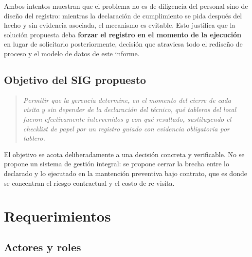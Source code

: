 \documentclass[10pt,letterpaper]{article}
\begin{document}
Ambos intentos muestran que el problema no es de diligencia del personal sino de
diseño del registro: mientras la declaración de cumplimiento se pida después del
hecho y sin evidencia asociada, el mecanismo es evitable. Esto justifica que la
solución propuesta deba \textbf{forzar el registro en el momento de la ejecución} en
lugar de solicitarlo posteriormente, decisión que atraviesa todo el rediseño de
proceso y el modelo de datos de este informe.

\subsection{Objetivo del SIG propuesto}

\begin{quote}
\itshape
Permitir que la gerencia determine, en el momento del cierre de cada visita y sin
depender de la declaración del técnico, qué tableros del local fueron efectivamente
intervenidos y con qué resultado, sustituyendo el checklist de papel por un registro
guiado con evidencia obligatoria por tablero.
\end{quote}

El objetivo se acota deliberadamente a una decisión concreta y verificable. No se
propone un sistema de gestión integral: se propone cerrar la brecha entre lo
declarado y lo ejecutado en la mantención preventiva bajo contrato, que es donde se
concentran el riesgo contractual y el costo de re-visita.

\section{Requerimientos}

\subsection{Actores y roles}
\end{document}
